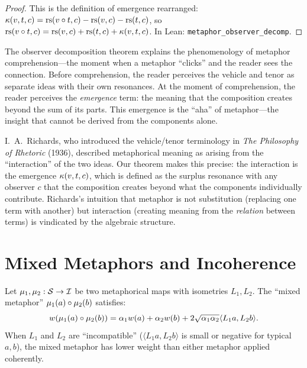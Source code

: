 \begin{proof}
This is the definition of emergence rearranged: $\kappa(v, t, c) = \mathrm{rs}(v \circ t, c) - \mathrm{rs}(v, c) - \mathrm{rs}(t, c)$, so $\mathrm{rs}(v \circ t, c) = \mathrm{rs}(v, c) + \mathrm{rs}(t, c) + \kappa(v, t, c)$.  In Lean: \texttt{metaphor\_observer\_decomp}.
\end{proof}

\begin{interpretation}
\label{interp:metaphor-click}
The observer decomposition theorem explains the phenomenology of metaphor comprehension---the moment when a metaphor ``clicks'' and the reader sees the connection.  Before comprehension, the reader perceives the vehicle and tenor as separate ideas with their own resonances.  At the moment of comprehension, the reader perceives the \emph{emergence} term: the meaning that the composition creates beyond the sum of its parts.  This emergence is the ``aha'' of metaphor---the insight that cannot be derived from the components alone.

I.~A.~Richards, who introduced the vehicle/tenor terminology in \textit{The Philosophy of Rhetoric} (1936), described metaphorical meaning as arising from the ``interaction'' of the two ideas.  Our theorem makes this precise: the interaction is the emergence $\kappa(v, t, c)$, which is defined as the surplus resonance with any observer $c$ that the composition creates beyond what the components individually contribute.  Richards's intuition that metaphor is not substitution (replacing one term with another) but interaction (creating meaning from the \emph{relation} between terms) is vindicated by the algebraic structure.
\end{interpretation}


\section{Mixed Metaphors and Incoherence}

\begin{theorem}
\label{thm:mixed-metaphor}
Let $\mu_1, \mu_2: \mathcal{S} \to \mathcal{I}$ be two metaphorical maps with
isometries $L_1, L_2$.  The ``mixed metaphor'' $\mu_1(a) \circ \mu_2(b)$
satisfies:
\[
  w(\mu_1(a) \circ \mu_2(b))
  = \alpha_1 w(a) + \alpha_2 w(b)
  + 2\sqrt{\alpha_1 \alpha_2} \langle L_1 a, L_2 b \rangle.
\]
When $L_1$ and $L_2$ are ``incompatible'' ($\langle L_1 a, L_2 b \rangle$
is small or negative for typical $a, b$), the mixed metaphor has lower weight
than either metaphor applied coherently.
\end{theorem}

